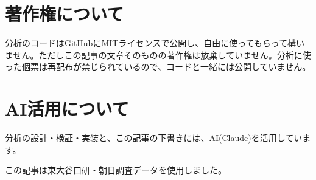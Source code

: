 \documentclass[a4paper,11pt]{ltjsarticle}
\begin{document}
\section*{著作権について}

分析のコードは\href{https://github.com/hrkimura/seiryoku-shisu/tree/master/sanseito_profile}{GitHub}にMITライセンスで公開し、自由に使ってもらって構いません。ただしこの記事の文章そのものの著作権は放棄していません。分析に使った個票は再配布が禁じられているので、コードと一緒には公開していません。

\section*{AI活用について}

分析の設計・検証・実装と、この記事の下書きには、AI(Claude)を活用しています。

{\small この記事は東大谷口研・朝日調査データを使用しました。}
\end{document}
